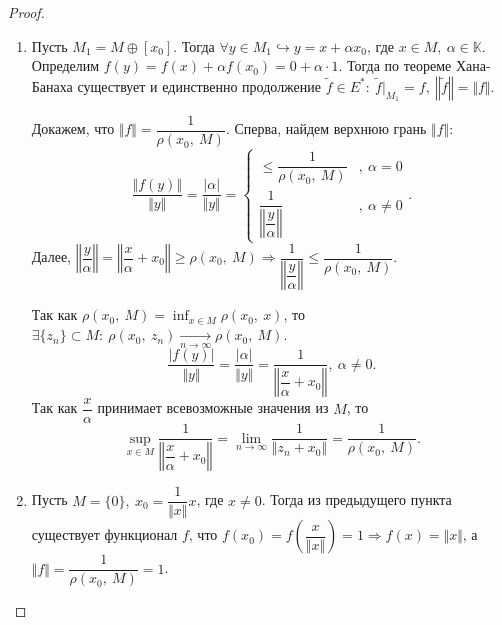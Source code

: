     \begin{proof} ~
    \begin{enumerate}
        \item Пусть $\displaystyle M_{1} =M\oplus [ x_{0}]$. Тогда $\displaystyle \forall y\in M_{1} \hookrightarrow y=x+\alpha x_{0}$, где $\displaystyle x\in M,\ \alpha \in \mathbb{K}$. Определим $\displaystyle f( y) =f( x) +\alpha f( x_{0}) =0+\alpha \cdotp 1$. Тогда по теореме Хана-Банаха существует и единственно продолжение $\displaystyle \tilde{f} \in E^{*} :\ \tilde{f} |_{M_{1}} =f,\ \left\Vert \tilde{f}\right\Vert =\Vert f\Vert $.
    
        Докажем, что $\displaystyle \Vert f\Vert =\dfrac{1}{\rho ( x_{0} ,\ M)}$. Сперва, найдем верхнюю грань $\displaystyle \Vert f\Vert $:
        \begin{equation*}
        \dfrac{\Vert f( y)\Vert }{\Vert y\Vert } =\dfrac{| \alpha | }{\Vert y\Vert } =\begin{cases}
        \leqslant \dfrac{1}{\rho ( x_{0} ,\ M)} & ,\ \alpha =0\\
        \dfrac{1}{\left\Vert \dfrac{y}{\alpha }\right\Vert } & ,\ \alpha \neq 0
        \end{cases} .
        \end{equation*}
        Далее, $\displaystyle \left\Vert \dfrac{y}{\alpha }\right\Vert =\left\Vert \dfrac{x}{\alpha } +x_{0}\right\Vert \geqslant \rho ( x_{0} ,\ M) \Rightarrow \dfrac{1}{\left\Vert \dfrac{y}{\alpha }\right\Vert } \leqslant \dfrac{1}{\rho ( x_{0} ,\ M)}$.
        
        Так как $\displaystyle \rho ( x_{0} ,\ M) =\inf_{x\in M} \rho ( x_{0} ,\ x)$, то $\displaystyle \exists \{z_{n}\} \subset M:\ \rho ( x_{0} ,\ z_{n})\xrightarrow[n\rightarrow \infty ]{} \rho ( x_{0} ,\ M)$.
        \begin{equation*}
        \dfrac{| f( y)| }{\Vert y\Vert } =\dfrac{| \alpha | }{\Vert y\Vert } =\dfrac{1}{\left\Vert \dfrac{x}{\alpha } +x_{0}\right\Vert } ,\ \alpha \neq 0.
        \end{equation*}
        Так как $\displaystyle \dfrac{x}{\alpha }$ принимает всевозможные значения из $\displaystyle M$, то
        \begin{equation*}
        \sup _{x\in M}\dfrac{1}{\left\Vert \dfrac{x}{\alpha } +x_{0}\right\Vert } =\lim _{n\rightarrow \infty }\dfrac{1}{\Vert z_{n} +x_{0}\Vert } =\dfrac{1}{\rho ( x_{0} ,\ M)} .
    \end{equation*}
        \item Пусть $\displaystyle M=\{0\} ,\ x_{0} =\dfrac{1}{\Vert x\Vert } x$, где $\displaystyle x\neq 0$. Тогда из предыдущего пункта существует функционал $\displaystyle f$, что $\displaystyle f( x_{0}) =f\left(\dfrac{x}{\Vert x\Vert }\right) =1\Rightarrow f( x) =\Vert x\Vert $, а $\displaystyle \Vert f\Vert =\dfrac{1}{\rho ( x_{0} ,\ M)} =1$.
    \end{enumerate}
    \end{proof}